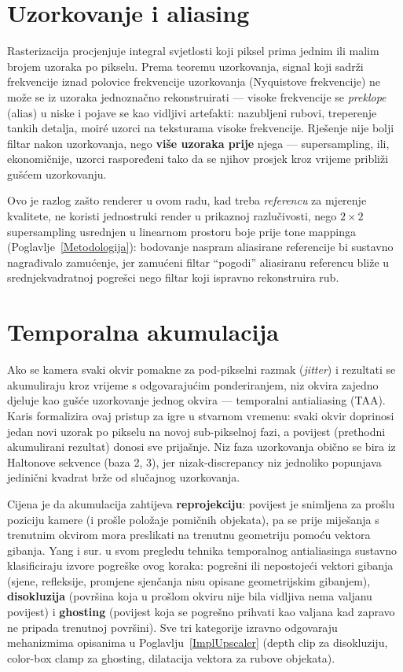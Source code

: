 \documentclass{mathos}
\begin{document}
\section{Uzorkovanje i aliasing}

Rasterizacija procjenjuje integral svjetlosti koji piksel prima jednim ili
malim brojem uzoraka po pikselu. Prema teoremu uzorkovanja, signal koji
sadrži frekvencije iznad polovice frekvencije uzorkovanja (Nyquistove
frekvencije) ne može se iz uzoraka jednoznačno rekonstruirati — visoke
frekvencije se \emph{preklope} (alias) u niske i pojave se kao vidljivi
artefakti: nazubljeni rubovi, treperenje tankih detalja, moiré uzorci na
teksturama visoke frekvencije. Rješenje nije bolji filtar nakon uzorkovanja,
nego \textbf{više uzoraka prije} njega — supersampling, ili, ekonomičnije,
uzorci raspoređeni tako da se njihov prosjek kroz vrijeme približi gušćem
uzorkovanju.

Ovo je razlog zašto renderer u ovom radu, kad treba \emph{referencu} za
mjerenje kvalitete, ne koristi jednostruki render u prikaznoj razlučivosti,
nego $2\times2$ supersampling usrednjen u linearnom prostoru boje prije
tone mappinga (Poglavlje~\ref{Metodologija}): bodovanje naspram aliasirane
referencije bi sustavno nagrađivalo zamućenje, jer zamućeni filtar
``pogodi'' aliasiranu referencu bliže u srednjekvadratnoj pogrešci nego
filtar koji ispravno rekonstruira rub.

\section{Temporalna akumulacija}

Ako se kamera svaki okvir pomakne za pod-pikselni razmak (\emph{jitter}) i
rezultati se akumuliraju kroz vrijeme s odgovarajućim ponderiranjem, niz
okvira zajedno djeluje kao gušće uzorkovanje jednog okvira — temporalni
antialiasing (TAA). Karis \cite{Karis} formalizira ovaj pristup za igre u
stvarnom vremenu: svaki okvir doprinosi jedan novi uzorak po pikselu na
novoj sub-pikselnoj fazi, a povijest (prethodni akumulirani rezultat) donosi
sve prijašnje. Niz faza uzorkovanja obično se bira iz Haltonove sekvence
(baza 2, 3), jer nizak-discrepancy niz jednoliko popunjava jedinični kvadrat
brže od slučajnog uzorkovanja.

Cijena je da akumulacija zahtijeva \textbf{reprojekciju}: povijest je
snimljena za prošlu poziciju kamere (i prošle položaje pomičnih objekata), pa
se prije miješanja s trenutnim okvirom mora preslikati na trenutnu geometriju
pomoću vektora gibanja. Yang i sur. \cite{YangSurvey} u svom pregledu
tehnika temporalnog antialiasinga sustavno klasificiraju izvore pogreške
ovog koraka: pogrešni ili nepostojeći vektori gibanja (sjene, refleksije,
promjene sjenčanja nisu opisane geometrijskim gibanjem), \textbf{disokluzija}
(površina koja u prošlom okviru nije bila vidljiva nema valjanu povijest) i
\textbf{ghosting} (povijest koja se pogrešno prihvati kao valjana kad
zapravo ne pripada trenutnoj površini). Sve tri kategorije izravno odgovaraju
mehanizmima opisanima u Poglavlju~\ref{ImplUpscaler} (depth clip za
disokluziju, color-box clamp za ghosting, dilatacija vektora za rubove
objekata).
\end{document}
